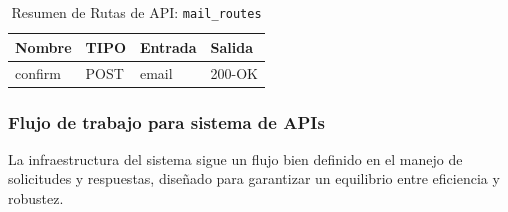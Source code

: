 \begin{table}[H]
\centering
\begin{tabularx}{\textwidth}{|l|l|l|X|}
\hline
\textbf{Nombre} & \textbf{TIPO} & \textbf{Entrada} & \textbf{Salida} \\ \hline
confirm & POST & email & 200-OK \\ \hline
\end{tabularx}
\caption{Resumen de Rutas de API: \texttt{mail\_routes}}
\label{tab:mail_routes}
\end{table}



\subsubsection{Flujo de trabajo para sistema de APIs}

La infraestructura del sistema sigue un flujo bien definido en el manejo de solicitudes y respuestas, diseñado para garantizar un equilibrio entre eficiencia y robustez.

